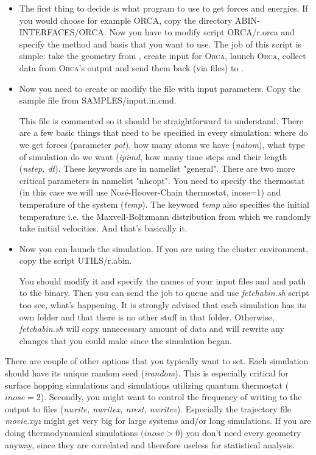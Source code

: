\begin{itemize}

\item The first thing to decide is what program to use to get forces and energies. If you would choose for example ORCA, copy the directory
ABIN-INTERFACES/ORCA. Now you have to modify script ORCA/r.orca and specify the method and basis that you want to use. The job of this script is simple: take the geometry from \abin, create input for \textsc{Orca}, launch \textsc{Orca}, collect data from \textsc{Orca}'s output and send them back (via files) to \abin.

\item Now you need to create or modify the file with input parameters. Copy the sample file from SAMPLES/input.in.cmd.

This file is commented so it should be straightforward to understand. There are a few basic things that need to be specified in every simulation: where do we get forces (parameter \textit{pot}), how many atoms we have (\textit{natom}), what type of simulation do we want (\textit{ipimd}, how many time steps and their length (\textit{nstep, dt}). These keywords are in namelist "general". There are two more critical parameters in namelist "nhcopt". You need to specify the thermostat (in this case we will use Nosé-Hoover-Chain thermostat, inose=1)
and temperature of the system (\textit{temp}). The keyword \textit{temp} also specifies the initial temperature i.e. the Maxvell-Boltzmann distribution from which we randomly take initial velocities. And that's basically it.

\item Now you can launch the simulation. If you are using the cluster environment, copy the script UTILS/r.abin.

You should modify it and specify the names of your input files and and path to the \abin binary. Then you can send the job to queue and use \textit{fetchabin.sh} script too see, what's happening. It is strongly advised that each simulation has its own folder and that there is no other stuff in that folder. Otherwise, \textit{fetchabin.sh} will copy unnecessary amount of data and will rewrite any changes that you could make since the simulation began. 

\end{itemize}

There are couple of other options that you typically want to set. Each simulation should have its unique random seed (\textit{irandom}). This is especially critical for surface hopping simulations and simulations utilizing quantum thermostat ($inose=2$). Secondly, you might want to control the frequency of writing to the output to files (\textit{nwrite, nwritex, nrest, nwritev}). Especially the trajectory file \textit{movie.xyz} might get very big for large systems and/or long simulations. If you are doing thermodynamical simulations $(inose > 0$) you don't need every geometry anyway, since they are correlated and therefore useless for statistical analysis.

